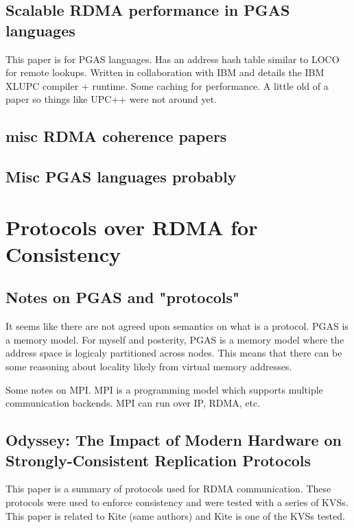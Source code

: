 \documentclass[sigplan,nonacm]{acmart}
\begin{document}
    \subsection{Scalable RDMA performance in PGAS languages}
    This paper is for PGAS languages. Has an address hash table similar to LOCO for remote lookups. Written in 
    collaboration with IBM and details  the IBM XLUPC compiler + runtime. Some caching for performance. A little old of a paper
    so things like UPC++ were not around yet.\cite{Farreras-IPDPS-2009}

    \subsection {misc RDMA coherence papers}

    \subsection{Misc PGAS languages probably}
\section{Protocols over RDMA for Consistency}

    \subsection{Notes on PGAS and "protocols"}
    It seems like there are not agreed upon semantics on what is a protocol. PGAS is a 
    memory model. For myself and posterity, PGAS is a memory model where the address space is logicaly partitioned across nodes.
    This means that there can be some reasoning about locality likely from virtual memory addresses.

    Some notes on MPI. MPI is a programming model which supports multiple communication backends. MPI 
    can run over IP, RDMA, etc. 

    \subsection {Odyssey: The Impact of Modern Hardware on Strongly-Consistent Replication Protocols}
    This paper is a summary of protocols used for RDMA communication. These protocols were used to 
    enforce consistency and were tested with a series of KVSs. This paper is related to Kite (same authors) 
    and Kite is one of the KVSs tested.\cite{Gavrielatos-EuroSys-2021}
\end{document}
